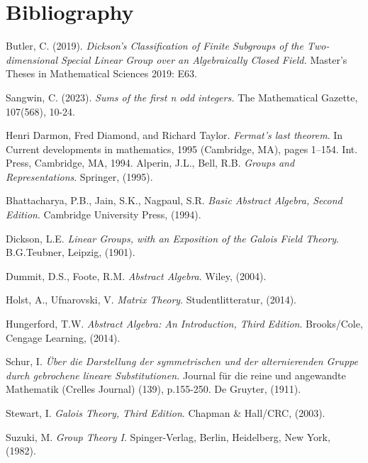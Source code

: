 
\chapter{Bibliography}

% 

\begin{thebibliography}{3}

    Butler, C. (2019). 
    \textit{Dickson's Classification of Finite Subgroups of the Two-dimensional Special Linear Group over an Algebraically Closed Field.}
    Master's Theses in Mathematical Sciences 2019: E63.
    
    Sangwin, C. (2023). 
    \textit{Sums of the first n odd integers.}
    The Mathematical Gazette, 107(568), 10-24.
    
    Henri Darmon, Fred Diamond, and Richard Taylor. 
    \textit{Fermat’s last theorem}. 
    In Current developments in mathematics, 
    1995 (Cambridge, MA), pages 1–154. Int. Press, Cambridge, MA, 1994.
    Alperin, J.L., Bell, R.B. 
    \textit{Groups and Representations}. 
    Springer,
    (1995).
    
    Bhattacharya, P.B., Jain, S.K., Nagpaul, S.R. 
    \textit{Basic Abstract Algebra, Second Edition}. 
    Cambridge University Press,
    (1994).
    
    Dickson, L.E. 
    \textit{Linear Groups, with an Exposition of the Galois Field Theory}. 
    B.G.Teubner, Leipzig,
    (1901).
    
    Dummit, D.S., Foote, R.M. 
    \textit{Abstract Algebra}. 
    Wiley,
    (2004).
    
    Holst, A., Ufnarovski, V. 
    \textit{Matrix Theory}. 
    Studentlitteratur,
    (2014).
    
    Hungerford, T.W. 
    \textit{Abstract Algebra: An Introduction, Third Edition}. 
    Brooks/Cole, Cengage Learning,
    (2014).
    
    Schur, I. 
    \textit{Über die Darstellung der symmetrischen und der alternierenden Gruppe durch gebrochene lineare Substitutionen.} Journal für die reine und angewandte Mathematik (Crelles Journal) (139), p.155-250. 
    De Gruyter,
    (1911).
    
    Stewart, I. 
    \textit{Galois Theory, Third Edition}. 
    Chapman \& Hall/CRC,
    (2003).
    
    Suzuki, M. 
    \textit{Group Theory I}. 
    Spinger-Verlag, Berlin, Heidelberg, New York, 
    (1982).
    
\end{thebibliography}